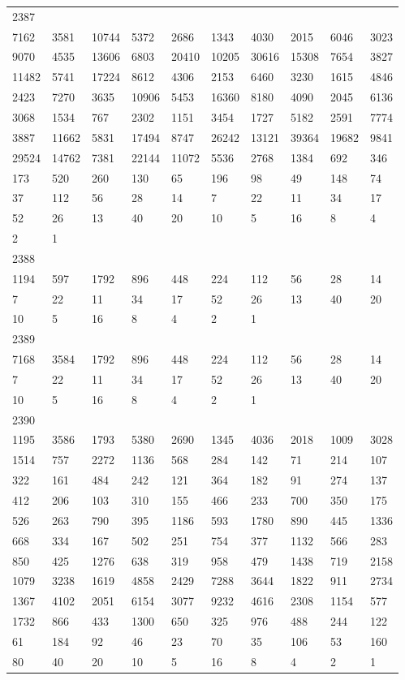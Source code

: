 \begin{longtable}{*{10}{l}}
2387&&&&&&&&&\\
7162& 3581& 10744& 5372& 2686& 1343& 4030& 2015& 6046& 3023\\
9070& 4535& 13606& 6803& 20410& 10205& 30616& 15308& 7654& 3827\\
11482& 5741& 17224& 8612& 4306& 2153& 6460& 3230& 1615& 4846\\
2423& 7270& 3635& 10906& 5453& 16360& 8180& 4090& 2045& 6136\\
3068& 1534& 767& 2302& 1151& 3454& 1727& 5182& 2591& 7774\\
3887& 11662& 5831& 17494& 8747& 26242& 13121& 39364& 19682& 9841\\
29524& 14762& 7381& 22144& 11072& 5536& 2768& 1384& 692& 346\\
173& 520& 260& 130& 65& 196& 98& 49& 148& 74\\
37& 112& 56& 28& 14& 7& 22& 11& 34& 17\\
52& 26& 13& 40& 20& 10& 5& 16& 8& 4\\
2& 1& \\

2388&&&&&&&&&\\
1194& 597& 1792& 896& 448& 224& 112& 56& 28& 14\\
7& 22& 11& 34& 17& 52& 26& 13& 40& 20\\
10& 5& 16& 8& 4& 2& 1& \\

2389&&&&&&&&&\\
7168& 3584& 1792& 896& 448& 224& 112& 56& 28& 14\\
7& 22& 11& 34& 17& 52& 26& 13& 40& 20\\
10& 5& 16& 8& 4& 2& 1& \\

2390&&&&&&&&&\\
1195& 3586& 1793& 5380& 2690& 1345& 4036& 2018& 1009& 3028\\
1514& 757& 2272& 1136& 568& 284& 142& 71& 214& 107\\
322& 161& 484& 242& 121& 364& 182& 91& 274& 137\\
412& 206& 103& 310& 155& 466& 233& 700& 350& 175\\
526& 263& 790& 395& 1186& 593& 1780& 890& 445& 1336\\
668& 334& 167& 502& 251& 754& 377& 1132& 566& 283\\
850& 425& 1276& 638& 319& 958& 479& 1438& 719& 2158\\
1079& 3238& 1619& 4858& 2429& 7288& 3644& 1822& 911& 2734\\
1367& 4102& 2051& 6154& 3077& 9232& 4616& 2308& 1154& 577\\
1732& 866& 433& 1300& 650& 325& 976& 488& 244& 122\\
61& 184& 92& 46& 23& 70& 35& 106& 53& 160\\
80& 40& 20& 10& 5& 16& 8& 4& 2& 1\\


\end{longtable}
